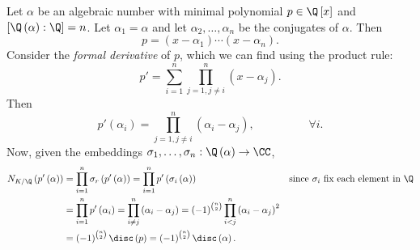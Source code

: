 \documentclass[pmath441]{subfiles}
\begin{document}
    \np Let $\alpha$ be an algebraic number with minimal polynomial $p\in\Q\left[ x \right]$ and $\left[ \Q\left( \alpha \right):\Q \right]=n$. Let $\alpha_1=\alpha$ and let $\alpha_2,\ldots,\alpha_n$ be the conjugates of $\alpha$. Then
    \begin{equation*}
        p = \left( x-\alpha_1 \right)\cdots\left( x-\alpha_n \right).
    \end{equation*}
    Consider the \textit{formal derivative} of $p$, which we can find using the product rule:
    \begin{equation*}
        p' = \sum^{n}_{i=1} \prod^{n}_{j=1,j\neq i} \left( x-\alpha_j \right) .
    \end{equation*}
    Then
    \begin{equation*}
        p'\left( \alpha_i \right) = \prod^{n}_{j=1,j\neq i} \left( \alpha_i-\alpha_j \right) , \hspace{2cm}\forall i.
    \end{equation*}
    Now, given the embeddings $\sigma_1,\ldots,\sigma_n:\Q\left( \alpha \right)\to\CC$,
    \begin{equation*}
        \begin{aligned}
            N_{K /\Q}\left( p'\left( \alpha \right) \right) & = \prod^{n}_{i=1} \sigma_r\left( p'\left( \alpha \right) \right) = \prod^{n}_{i=1} p'\left( \sigma_i\left( \alpha \right) \right) && \text{since $\sigma_i$ fix each element in $\Q$} \\
                                                            & = \prod^{n}_{i=1} p'\left( \alpha_i \right) = \prod^{n}_{i\neq j} \left( \alpha_i-\alpha_j \right) = \left( -1 \right)^{\binom{n}{2}} \prod^{n}_{i<j} \left( \alpha_i-\alpha_j \right)^{2} \\
                                                            & = \left( -1 \right)^{\binom{n}{2}} \disc\left( p \right) = \left( -1 \right)^{\binom{n}{2}} \disc\left( \alpha \right) .
        \end{aligned} 
    \end{equation*}
\end{document}

